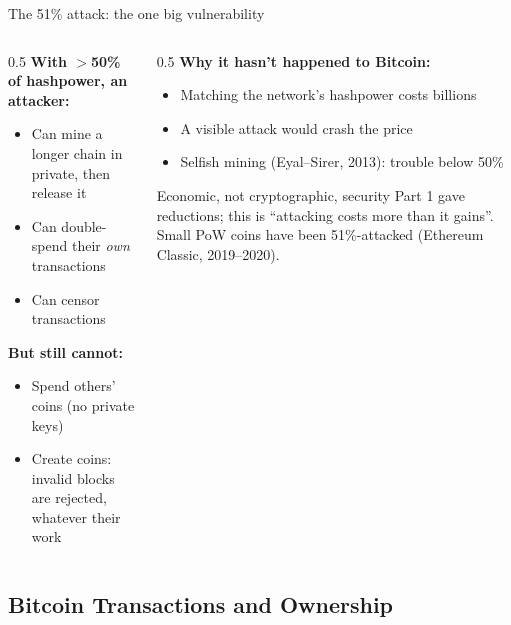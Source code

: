 \ifdefined\PRESENTATION\else\PassOptionsToClass{handout}{beamer}\fi\documentclass[aspectratio=169, lualatex]{beamer}
\begin{document}
\begin{frame}{The 51\% attack: the one big vulnerability}
	\begin{columns}[c]
		\begin{column}{0.5\textwidth}
			\textbf{With $>$50\% of hashpower, an attacker:}
			\begin{itemize}
				\item Can mine a longer chain in private, then release it
				\item Can double-spend their \emph{own} transactions
				\item Can censor transactions
			\end{itemize}
			\textbf{But still cannot:}
			\begin{itemize}
				\item Spend others' coins (no private keys)
				\item Create coins: invalid blocks are rejected, whatever their work
			\end{itemize}
		\end{column}
		\begin{column}{0.5\textwidth}
			\textbf{Why it hasn't happened to Bitcoin:}
			\begin{itemize}
				\item Matching the network's hashpower costs billions
				\item A visible attack would crash the price
				\item Selfish mining (Eyal--Sirer, 2013): trouble below 50\%
			\end{itemize}
			\begin{alertblock}{Economic, not cryptographic, security}
				Part 1 gave reductions; this is ``attacking costs more than it gains''. Small PoW coins have been 51\%-attacked (Ethereum Classic, 2019--2020).
			\end{alertblock}
		\end{column}
	\end{columns}
\end{frame}

\subsection{Bitcoin Transactions and Ownership}
\end{document}
